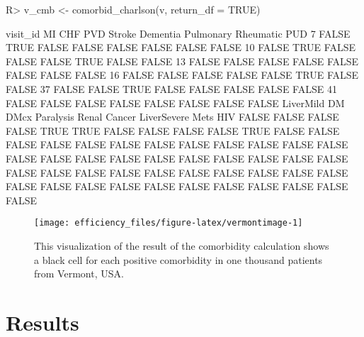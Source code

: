 \documentclass[article]{jss}
\begin{document}
\begin{CodeChunk}

\begin{CodeInput}
R> v_cmb <- comorbid_charlson(v, return_df = TRUE)
\end{CodeInput}
\end{CodeChunk}

\begin{CodeChunk}

\begin{CodeOutput}
 visit_id    MI   CHF   PVD Stroke Dementia Pulmonary Rheumatic   PUD
        7 FALSE  TRUE FALSE  FALSE    FALSE     FALSE     FALSE FALSE
       10 FALSE  TRUE FALSE  FALSE    FALSE      TRUE     FALSE FALSE
       13 FALSE FALSE FALSE  FALSE    FALSE     FALSE     FALSE FALSE
       16 FALSE FALSE FALSE  FALSE    FALSE      TRUE     FALSE FALSE
       37 FALSE FALSE  TRUE  FALSE    FALSE     FALSE     FALSE FALSE
       41 FALSE FALSE FALSE  FALSE    FALSE     FALSE     FALSE FALSE
 LiverMild    DM  DMcx Paralysis Renal Cancer LiverSevere  Mets   HIV
     FALSE FALSE FALSE     FALSE  TRUE   TRUE       FALSE FALSE FALSE
     FALSE  TRUE FALSE     FALSE FALSE  FALSE       FALSE FALSE FALSE
     FALSE FALSE FALSE     FALSE FALSE  FALSE       FALSE FALSE FALSE
     FALSE FALSE FALSE     FALSE FALSE  FALSE       FALSE FALSE FALSE
     FALSE FALSE FALSE     FALSE FALSE  FALSE       FALSE FALSE FALSE
     FALSE FALSE FALSE     FALSE FALSE  FALSE       FALSE FALSE FALSE
\end{CodeOutput}
\end{CodeChunk}

\begin{CodeChunk}
\begin{figure}

{\centering \texttt{[image: efficiency\_files/figure-latex/vermontimage-1]} 

}

\caption[This visualization of the result of the comorbidity calculation shows a black cell for each positive comorbidity in one thousand patients from Vermont, USA]{This visualization of the result of the comorbidity calculation shows a black cell for each positive comorbidity in one thousand patients from Vermont, USA.}\label{fig:vermontimage}
\end{figure}
\end{CodeChunk}

\hypertarget{results}{%
\section{Results}\label{results}}
\end{document}
